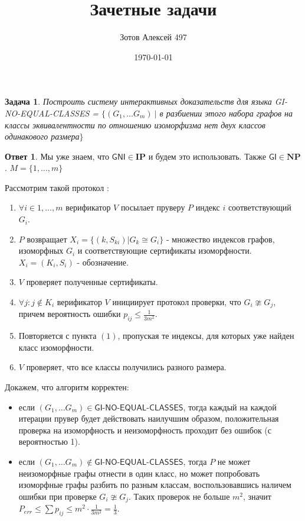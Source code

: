 \documentclass[a4paper]{article}
\title{Зачетные задачи}
\author{Зотов Алексей 497}
\date{\today}
\theoremstyle{plain}
\newtheorem{task}{Задача}
\theoremstyle{definition}
\newtheorem*{answer}{Ответ}
\begin{document}
\maketitle

\begin{task}
Построить систему интерактивных доказательств для языка \textsf{GI-NO-EQUAL-CLASSES} = $\{(G_1, \ldots G_m) \ |$  в разбиении этого набора графов на классы эквивалентности по отношению изоморфизма нет двух классов одинакового размера$\}$
\end{task}
\begin{answer}  
    Мы уже знаем, что $\textsf{GNI} \in \mathbf{IP}$ и будем это использовать. Также $\textsf{GI} \in \mathbf{NP}$. $M = \{1,\ldots,m\}$
    \item Рассмотрим такой протокол :
    \begin{enumerate}
        \item $\forall i \in 1,\ldots , m$  верификатор $V$ посылает пруверу $P$ индекс $i$ соответствующий $G_i$.
        \item $P$ возвращает $X_i = \{(k,S_{ki}) | G_k \cong G_i\}$ - множество индексов графов, изоморфных $G_i$ и соответствующие сертификаты изоморфности. $X_i = (K_i,S_i)$ - обозначение.
        \item $V$ проверяет полученные сертификаты. 
        \item $\forall j : j \notin K_i$ верификатор $V$ инициирует протокол проверки, что $G_i \ncong G_j$, причем вероятность ошибки $p_{ij} \leq \frac{1}{3m^2}$. 
        \item Повторяется с пункта $(1)$, пропуская те индексы, для которых уже найден класс изоморфности.
        \item $V$ проверяет, что все классы получились разного размера.
    \end{enumerate}
    Докажем, что алгоритм корректен: 
    \begin{itemize}
        \item если $(G_1, \ldots G_m) \in \textsf{GI-NO-EQUAL-CLASSES}$, тогда каждый на каждой итерации прувер будет действовать наилучшим образом, положительная проверка на изоморфность и неизоморфность проходит без ошибок (с вероятностью 1). 
        \item если $(G_1, \ldots G_m) \notin \textsf{GI-NO-EQUAL-CLASSES}$, тогда $P$ не может неизоморфные графы отнести в один класс, но может попробовать изоморфные графы разбить по разным классам, воспользовавшись наличем ошибки при проверке $G_i \ncong G_j$. Таких проверок не больше $m^2$, значит $P_{err} \leq \sum p_{ij} \leq m^2 \cdot \frac{1}{3m^2} = \frac{1}{3}$.
    \end{itemize}
\end{answer}
\end{document}
